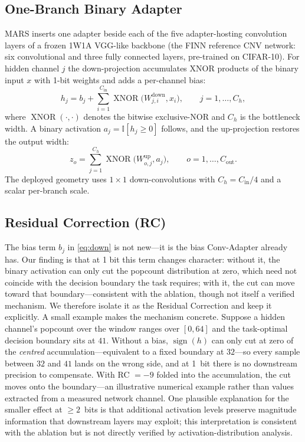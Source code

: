 \documentclass[journal]{IEEEtran}
\begin{document}
\subsection{One-Branch Binary Adapter}
MARS inserts one adapter beside each of the five adapter-hosting convolution layers of a frozen 1W1A VGG-like backbone (the FINN reference CNV network: six convolutional and three fully connected layers, pre-trained on CIFAR-10). For hidden channel $j$ the down-projection accumulates XNOR products of the binary input $x$ with 1-bit weights and adds a per-channel bias:
\begin{equation}
h_j = b_j + \sum_{i=1}^{C_{\text{in}}} \operatorname{XNOR}\bigl(W^{\text{down}}_{j,i}, x_i\bigr), \qquad j = 1, \ldots, C_h,
\label{eq:down}
\end{equation}
where $\operatorname{XNOR}(\cdot,\cdot)$ denotes the bitwise exclusive-NOR and $C_h$ is the bottleneck width. A binary activation $a_j = \mathbb{I}[h_j \ge 0]$ follows, and the up-projection restores the output width:
\begin{equation}
z_o = \sum_{j=1}^{C_h} \operatorname{XNOR}\bigl(W^{\text{up}}_{o,j}, a_j\bigr), \qquad o = 1, \ldots, C_{\text{out}}.
\label{eq:up}
\end{equation}
The deployed geometry uses $1{\times}1$ down-convolutions with $C_h = C_{\text{in}}/4$ and a scalar per-branch scale.

\subsection{Residual Correction (RC)}
The bias term $b_j$ in \eqref{eq:down} is not new---it is the bias Conv-Adapter already has. Our finding is that at 1 bit this term changes character: without it, the binary activation can only cut the popcount distribution at zero, which need not coincide with the decision boundary the task requires; with it, the cut can move toward that boundary---consistent with the ablation, though not itself a verified mechanism. We therefore isolate it as the Residual Correction and keep it explicitly. A small example makes the mechanism concrete. Suppose a hidden channel's popcount over the window ranges over $[0, 64]$ and the task-optimal decision boundary sits at $41$. Without a bias, $\operatorname{sign}(h)$ can only cut at zero of the \emph{centred} accumulation---equivalent to a fixed boundary at $32$---so every sample between $32$ and $41$ lands on the wrong side, and at 1~bit there is no downstream precision to compensate. With RC $=-9$ folded into the accumulation, the cut moves onto the boundary---an illustrative numerical example rather than values extracted from a measured network channel. One plausible explanation for the smaller effect at ${\geq}2$~bits is that additional activation levels preserve magnitude information that downstream layers may exploit; this interpretation is consistent with the ablation but is not directly verified by activation-distribution analysis.
\end{document}
